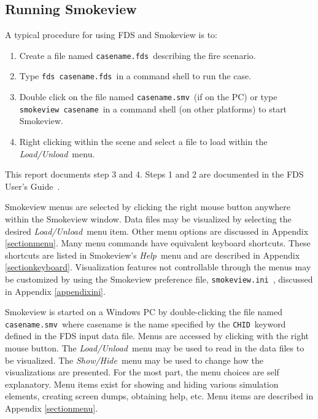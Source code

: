 \documentclass[11pt,twoside]{book}
\newcommand{\svini}{{\tt smokeview.ini}\ }
\begin{document}

\subsection{Running Smokeview}

A typical procedure for using FDS and Smokeview is to:
\begin{enumerate}

\item Create a file named {\tt casename.fds}\ describing the fire
scenario.

\item Type {\tt fds~casename.fds}\ in a command shell to run the
case.

\item Double click on the file named {\tt casename.smv}\ (if on the
PC) or type {\tt smokeview~casename}\ in a command shell (on other
platforms) to start Smokeview.

\item Right clicking within the scene and select a file to load
within the {\em Load/Unload}\ menu.
\end{enumerate}

\noindent This report documents step 3 and 4. Steps 1 and 2 are
documented in the FDS User's Guide~\cite{FDS_Users_Guide}.

Smokeview menus are selected by clicking the right mouse
button anywhere within the Smokeview window.  Data files may be
visualized by selecting the desired {\em Load/Unload}\ menu item.
Other menu options are discussed in Appendix
\ref{sectionmenu}. Many menu commands have equivalent keyboard
shortcuts. These shortcuts are listed in Smokeview's {\em Help}\
menu and are described in Appendix \ref{sectionkeyboard}.
Visualization features not controllable through the menus may be
customized by using the Smokeview preference file, \svini,
discussed in Appendix \ref{appendixini}.

Smokeview  is started on a Windows PC by double-clicking the file
named {\tt casename.smv}\ where casename is the name specified by
the {\tt CHID}\ keyword defined in the FDS input data file. Menus
are accessed by clicking with the right mouse button.  The {\em
Load/Unload}\ menu may be used to read in the data files to be
visualized. The {\em Show/Hide}\ menu may be used to change how
the visualizations are presented. For the most part, the menu
choices are self explanatory. Menu items exist for showing and
hiding various simulation elements, creating screen dumps,
obtaining help, etc. Menu items are described in Appendix
\ref{sectionmenu}.
\end{document}
